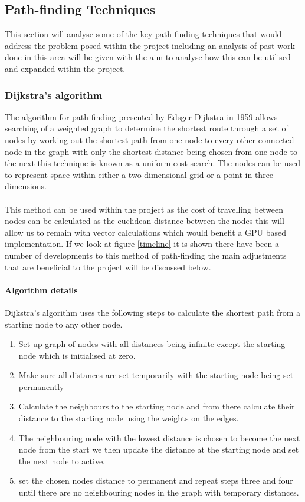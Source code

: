\subsection{Path-finding Techniques}
This section will analyse some of the key path finding techniques that would address the problem posed within the project including an analysis of past work done in this area will be given with the aim to analyse how this can be utilised and expanded within the project. 
\subsubsection{Dijkstra's algorithm}
The algorithm for path finding presented by Edsger Dijkstra in 1959 \cite{dijkstra} allows searching of a weighted graph to determine the shortest route through a set of nodes by working out the shortest path from one node to every other connected node in the graph with only the shortest distance being chosen from one node to the next this technique is known as a uniform cost search. The nodes can be used to represent space within either a two dimensional grid or a point in three dimensions.\\\\ This method can be used within the project as the cost of travelling between nodes can be calculated as the euclidean distance between the nodes this will allow us to remain with vector calculations which would benefit a GPU based implementation. If we look at figure \ref{timeline} it is shown there have been a number of developments to this method of path-finding the main adjustments that are beneficial to the project will be discussed below.
\paragraph{Algorithm details}
Dijkstra's algorithm uses the following steps to calculate the shortest path from a starting node to any other node.

\begin{enumerate}
	\item Set up graph of nodes with all distances being infinite except the starting node which is initialised at zero.
	\item Make sure all distances are set temporarily with the starting node being set permanently
	\item Calculate the neighbours to the starting node and from there calculate their distance to the starting node using the weights on the edges.
	\item The neighbouring node with the lowest distance is chosen to become the next node from the start we then update the distance at the starting node and set the next node to active.
	\item set the chosen nodes distance to permanent and repeat steps three and four until there are no neighbouring nodes in the graph with temporary distances.      
\end{enumerate}
 
